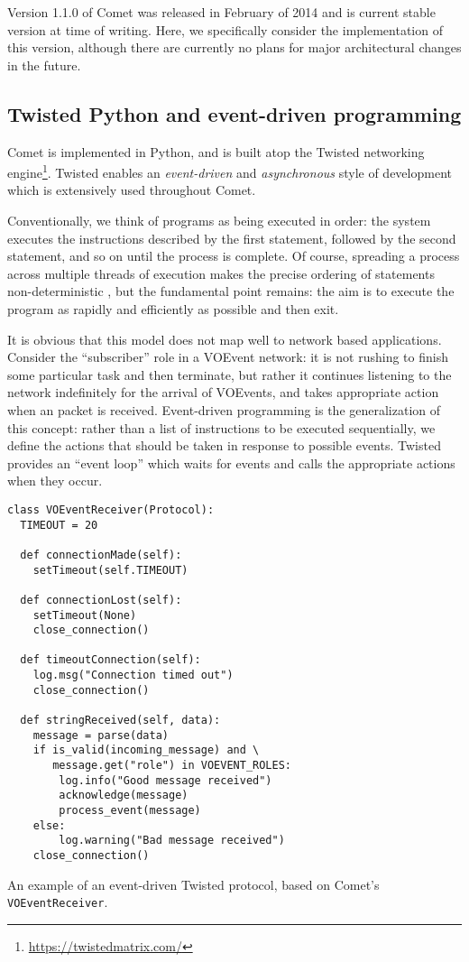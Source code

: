 \documentclass[5p,authoryear]{elsarticle}
\begin{document}
Version 1.1.0 of Comet was released in February of 2014 and is current stable
version at time of writing. Here, we specifically consider the implementation
of this version, although there are currently no plans for major architectural
changes in the future.

\subsection{Twisted Python and event-driven programming}
\label{sec:design:twisted}

Comet is implemented in Python, and is built atop the Twisted networking
engine\footnote{\url{https://twistedmatrix.com/}}. Twisted enables an
\textit{event-driven} and \textit{asynchronous} style of development which is
extensively used throughout Comet.

Conventionally, we think of programs as being executed in order: the system
executes the instructions described by the first statement, followed by the
second statement, and so on until the process is complete. Of course,
spreading a process across multiple threads of execution makes the precise
ordering of statements non-deterministic \citep[and, indeed, introduces a whole
new level of complexity in the process;][]{Lee:2006}, but the fundamental
point remains: the aim is to execute the program as rapidly and efficiently as
possible and then exit.

It is obvious that this model does not map well to network based applications.
Consider the ``subscriber'' role in a VOEvent network: it is not rushing to
finish some particular task and then terminate, but rather it continues
listening to the network indefinitely for the arrival of VOEvents, and takes
appropriate action when an packet is received. Event-driven programming is the
generalization of this concept: rather than a list of instructions to be
executed sequentially, we define the actions that should be taken in response
to possible events. Twisted provides an ``event loop'' which waits for events
and calls the appropriate actions when they occur.

\begin{listing}[t]
\begin{verbatim}
class VOEventReceiver(Protocol):
  TIMEOUT = 20

  def connectionMade(self):
    setTimeout(self.TIMEOUT)

  def connectionLost(self):
    setTimeout(None)
    close_connection()

  def timeoutConnection(self):
    log.msg("Connection timed out")
    close_connection()

  def stringReceived(self, data):
    message = parse(data)
    if is_valid(incoming_message) and \
       message.get("role") in VOEVENT_ROLES:
        log.info("Good message received")
        acknowledge(message)
        process_event(message)
    else:
        log.warning("Bad message received")
    close_connection()
\end{verbatim}
\caption{An example of an event-driven Twisted protocol, based on Comet's
\texttt{VOEventReceiver}.}
\label{lst:event}
\end{listing}
\end{document}
